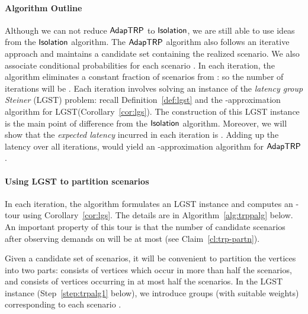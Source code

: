 \documentclass[11pt]{article}
\def\isoprob{\ensuremath{{\sf Isolation}}\xspace}
\def\strp{\ensuremath{{\sf AdapTRP}}\xspace}
\def\lgs{{\sf LGST}\xspace}
\begin{document}
\paragraph{Algorithm Outline} Although we can not reduce \strp to \isoprob, we are still able to use ideas from the \isoprob algorithm. The \strp algorithm also follows an iterative approach and maintains a candidate set   containing the realized scenario. 
We also associate conditional probabilities  for each scenario . In each iteration, the algorithm eliminates a constant fraction of scenarios from : so the number of iterations will be . Each iteration involves solving  an instance of the 
{\em latency group Steiner} (\lgs) problem: recall Definition~\ref{def:lgst} and the -approximation algorithm for \lgs (Corollary~\ref{cor:lgs}). The construction of this \lgs instance is the main point of difference from the \isoprob algorithm. Moreover, we will show that the {\em expected latency} incurred in each iteration is . Adding up the latency over all iterations, would yield an -approximation algorithm for \strp.
 
 
 
\paragraph{Using \lgs to partition scenarios } In each iteration, the algorithm formulates an \lgs instance and computes an -tour  using Corollary~\ref{cor:lgs}. The details are in Algorithm~\ref{alg:trppalg} below. An important property of this tour  is that the number of  candidate scenarios after observing demands on  will be at most  (see Claim~\ref{cl:trp-partn}).

Given a candidate set  of scenarios, it will be convenient to partition the vertices into two parts:  consists of vertices which occur in more than half the scenarios, and  consists of vertices occurring in at most half the scenarios. In the \lgs instance (Step~\ref{step:trpalg1} below), we 
introduce  groups (with suitable weights) corresponding to each scenario .
\end{document}
